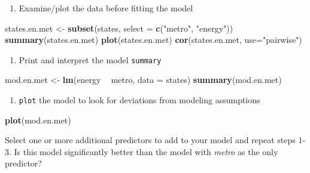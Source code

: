\documentclass[]{book}
\newenvironment{Shaded}{\begin{snugshade}}{\end{snugshade}}
\newcommand{\KeywordTok}[1]{\textcolor[rgb]{0.13,0.29,0.53}{\textbf{#1}}}
\newcommand{\DataTypeTok}[1]{\textcolor[rgb]{0.13,0.29,0.53}{#1}}
\newcommand{\StringTok}[1]{\textcolor[rgb]{0.31,0.60,0.02}{#1}}
\newcommand{\OperatorTok}[1]{\textcolor[rgb]{0.81,0.36,0.00}{\textbf{#1}}}
\newcommand{\NormalTok}[1]{#1}
\providecommand{\tightlist}{%
  \setlength{\itemsep}{0pt}\setlength{\parskip}{0pt}}
\begin{document}
\begin{enumerate}
\def\labelenumi{\arabic{enumi}.}
\tightlist
\item
  Examine/plot the data before fitting the model
\end{enumerate}

\begin{Shaded}
\begin{Highlighting}[]
\NormalTok{  states.en.met <-}\StringTok{ }\KeywordTok{subset}\NormalTok{(states, }\DataTypeTok{select =} \KeywordTok{c}\NormalTok{(}\StringTok{"metro"}\NormalTok{, }\StringTok{"energy"}\NormalTok{))}
  \KeywordTok{summary}\NormalTok{(states.en.met)}
  \KeywordTok{plot}\NormalTok{(states.en.met)}
  \KeywordTok{cor}\NormalTok{(states.en.met, }\DataTypeTok{use=}\StringTok{"pairwise"}\NormalTok{)}
\end{Highlighting}
\end{Shaded}

\begin{enumerate}
\def\labelenumi{\arabic{enumi}.}
\setcounter{enumi}{1}
\tightlist
\item
  Print and interpret the model \texttt{summary}
\end{enumerate}

\begin{Shaded}
\begin{Highlighting}[]
\NormalTok{  mod.en.met <-}\StringTok{ }\KeywordTok{lm}\NormalTok{(energy }\OperatorTok{~}\StringTok{ }\NormalTok{metro, }\DataTypeTok{data =}\NormalTok{ states)}
  \KeywordTok{summary}\NormalTok{(mod.en.met)}
\end{Highlighting}
\end{Shaded}

\begin{enumerate}
\def\labelenumi{\arabic{enumi}.}
\setcounter{enumi}{2}
\tightlist
\item
  \texttt{plot} the model to look for deviations from modeling
  assumptions
\end{enumerate}

\begin{Shaded}
\begin{Highlighting}[]
  \KeywordTok{plot}\NormalTok{(mod.en.met)}
\end{Highlighting}
\end{Shaded}

Select one or more additional predictors to add to your model and repeat
steps 1-3. Is this model significantly better than the model with
\emph{metro} as the only predictor?
\end{document}
